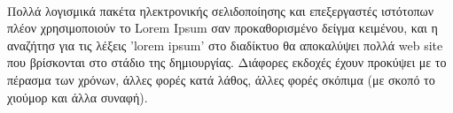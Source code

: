     \paragraph{}
    Πολλά λογισμικά πακέτα ηλεκτρονικής σελιδοποίησης και επεξεργαστές ιστότοπων πλέον χρησιμοποιούν το Lorem Ipsum σαν
    προκαθορισμένο δείγμα κειμένου, και η αναζήτησ για τις λέξεις 'lorem ipsum' στο διαδίκτυο θα αποκαλύψει πολλά web site
    που βρίσκονται στο στάδιο της δημιουργίας. Διάφορες εκδοχές έχουν προκύψει με το πέρασμα των χρόνων, άλλες φορές κατά
    λάθος, άλλες φορές σκόπιμα (με σκοπό το χιούμορ και άλλα συναφή).

    \begin{table}[h!]
        \centering
        \caption{Fisher's Iris data}
        \label{tab:table1}
    \end{table}

\newpage
